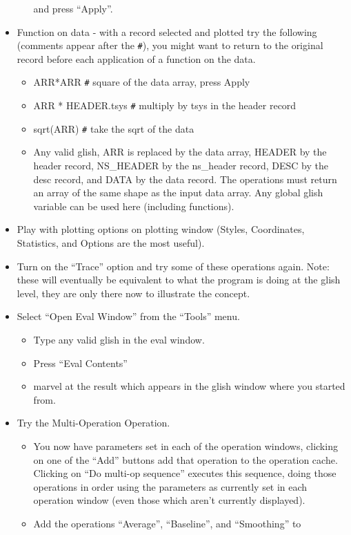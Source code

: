 \begin{itemize}
\begin{itemize}
and press ``Apply''.
\end{itemize}
\item Function on data - with a record selected and plotted try the following
(comments appear after the \verb_#_), you might want to return to the original
record before each application of a function on the data.
\begin{itemize}
\item ARR*ARR  \verb_#_ square of the data array, press Apply
\item ARR * HEADER.tsys  \verb_#_ multiply by tsys in the header record
\item sqrt(ARR) \verb_#_ take the sqrt of the data
\item Any valid glish, ARR is replaced by the data array, HEADER by
the header record, NS\_HEADER by the ns\_header record, DESC by the 
desc record, and DATA by the data record.  The operations must return
an array of the same shape as the input data array.  Any global glish
variable can be used here (including functions).
\end{itemize}
\item Play with plotting options on plotting window (Styles, Coordinates,
Statistics, and Options are the most useful).
\item Turn on the ``Trace'' option and try some of these operations again.
Note: these will eventually be equivalent to what the program is doing
at the glish level, they are only there now to illustrate the concept.
\item Select ``Open Eval Window'' from the ``Tools'' menu.
\begin{itemize}
\item Type any valid glish in the eval window.
\item Press ``Eval Contents''
\item marvel at the result which appears in the glish window where you
started from.
\end{itemize}
\item Try the Multi-Operation Operation.
\begin{itemize}
\item You now have parameters set in each of the operation windows, clicking
on one of the ``Add'' buttons add that operation to the operation
cache.  Clicking on ``Do multi-op sequence'' executes this sequence,
doing those operations in order using the parameters as currently set
in each operation window (even those which aren't currently displayed).
\item Add the operations ``Average'', ``Baseline'', and ``Smoothing'' to

\end{itemize}
\end{itemize}
